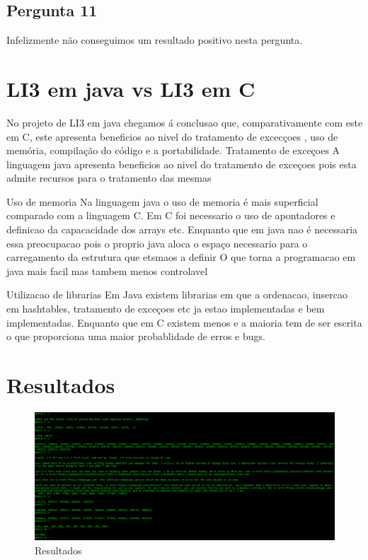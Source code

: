 \documentclass[a4paper]{article}
\begin{document}
	\subsection{Pergunta 11}
		Infelizmente não conseguimos um resultado positivo nesta pergunta.

\pagebreak
\section{LI3 em java vs LI3 em C}

No projeto de LI3 em java chegamos á conclusao que, comparativamente com este em C, este apresenta beneficios ao nivel do tratamento de excecçoes , uso de memória, compilação do código e a portabilidade.
Tratamento de exceçoes 
A linguagem java apresenta beneficios ao nivel do tratamento de exceçoes pois esta admite recursos para o tratamento das mesmas

Uso de memoria 
Na linguagem java o uso de memoria é mais superficial comparado com a linguagem C. Em C foi necessario o uso de apontadores e definicao da capacacidade dos arrays etc. Enquanto que em java nao é necessaria essa preocupacao pois o proprio java aloca o espaço necessario para o carregamento da estrutura que etsmaos a definir
O que torna a programacao em java mais facil mas tambem menos controlavel

Utilizacao de librarias 
Em Java existem librarias em que a ordenacao, insercao em hashtables, tratamento de exceçoes etc ja estao implementadas e bem implementadas. Enquanto que em C existem menos e a maioria tem de ser escrita o que proporciona uma maior probablidade de erros e bugs.
		
\section {Resultados}

\begin{figure}[H]
	\centering
	\includegraphics[scale =0.23]{resultados.png}
	\caption{Resultados}
	\label{img:Resultados}
	\end{figure}
\end{document}
